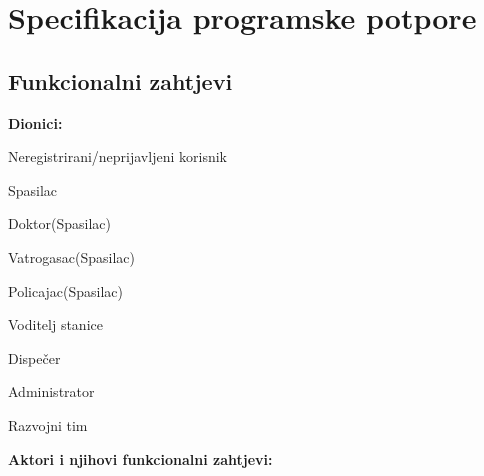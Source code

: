 \chapter{Specifikacija programske potpore}
		
	\section{Funkcionalni zahtjevi}

		\noindent \textbf{Dionici:}
		
		\begin{packed_enum}
			
			\item Neregistrirani/neprijavljeni korisnik
			\item Spasilac
			\item Doktor(Spasilac)
			\item Vatrogasac(Spasilac)
			\item Policajac(Spasilac)
			\item Voditelj stanice		
			\item Dispečer
			\item Administrator
			\item Razvojni tim
	
			\end{packed_enum}
			
			\noindent \textbf{Aktori i njihovi funkcionalni zahtjevi:}
			

